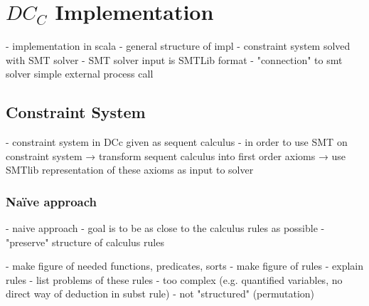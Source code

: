 \chapter{$DC_C$ Implementation}
- implementation in scala
- general structure of impl
  - constraint system solved with SMT solver
  - SMT solver input is SMTLib format
  - "connection" to smt solver simple external process call

\section{Constraint System}
- constraint system in DCc given as sequent calculus
- in order to use SMT on constraint system
  → transform sequent calculus into first order axioms
  → use SMTlib representation of these axioms as input to solver
\subsection{Na\"ive approach}
- naive approach
- goal is to be as close to the calculus rules as possible
- "preserve" structure of calculus rules

- make figure of needed functions, predicates, sorts
- make figure of rules
- explain rules
- list problems of these rules
  - too complex (e.g. quantified variables, no direct way of deduction in subst rule)
  - not "structured" (permutation)

